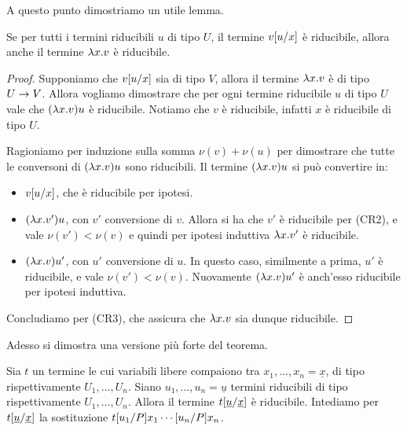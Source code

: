 \documentclass[]{marticle}
\begin{document}
A questo punto dimostriamo un utile lemma.

\begin{block}[Lemma]
    Se per tutti i termini riducibili $u$ di tipo $U$, il termine $v[u/x]$
    \`e riducibile, allora anche il termine $\lambda x.v$ \`e riducibile.
\end{block}

\begin{proof}
    Supponiamo che $v[u/x]$ sia di tipo $V$, allora il termine $\lambda x.v$ \`e
    di tipo $U\rightarrow V$. Allora vogliamo dimostrare che per ogni termine
    riducibile $u$ di tipo $U$ vale che $(\lambda x.v)u$ \`e riducibile. Notiamo che
    $v$ \`e riducibile, infatti $x$ \`e riducibile di tipo $U$.

    Ragioniamo per induzione sulla somma $\nu(v)+\nu(u)$ per dimostrare che
    tutte le conversoni di $(\lambda x.v)u$ sono riducibili. Il termine $(\lambda x.v)u$
    si pu\`o convertire in:
    \begin{itemize}
        \item $v[u/x]$, che \`e riducibile per ipotesi.
        \item $(\lambda x. v')u$, con $v'$ conversione di $v$. Allora si ha che $v'$
            \`e riducibile per (CR2), e vale $\nu(v')<\nu(v)$ e quindi per
            ipotesi induttiva $\lambda x. v'$ \`e riducibile.
        \item $(\lambda x. v)u'$, con $u'$ conversione di $u$. In questo caso,
            similmente a prima, $u'$ \`e riducibile, e vale $\nu(v')<\nu(v)$.
            Nuovamente $(\lambda x. v)u'$ \`e anch'esso riducibile per ipotesi
            induttiva.
    \end{itemize}
    Concludiamo per (CR3), che assicura che $\lambda x.v$ sia dunque riducibile.
\end{proof}

Adesso si dimostra una versione pi\`u forte del teorema.

\begin{block}[Proposizione]
    Sia $t$ un termine le cui variabili libere compaiono tra $x_1, \dots, x_n =
    \underline{x}$, di tipo rispettivamente $U_1, \dots, U_n$. Siano $u_1,
    \dots, u_n = \underline{u}$ termini riducibili di tipo rispettivamente $U_1,
    \dots, U_n$. Allora il termine $t[\underline{u}/\underline{x}]$ \`e
    riducibile. Intediamo per $t[\underline{u}/\underline{x}]$ la
    sostituzione $t[u_1/P]{x_1}\cdots[u_n/P]{x_n}$.
\end{block}
\end{document}
